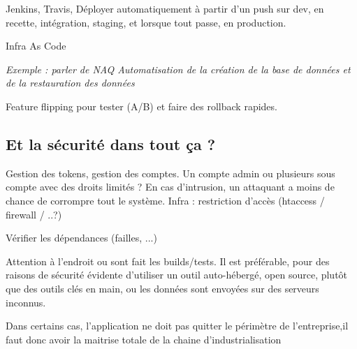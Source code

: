 Jenkins, Travis, Déployer automatiquement à partir d'un push sur dev, en recette, intégration, staging, et lorsque tout passe, en production.

Infra As Code %

\textit{Exemple : parler de NAQ Automatisation de la création de la base de données et de la restauration des données}

Feature flipping pour tester (A/B) et faire des rollback rapides.

\subsection{Et la sécurité dans tout ça ?}


Gestion des tokens, gestion des comptes.
Un compte admin ou plusieurs sous compte avec des droits limités ? En cas d'intrusion, un attaquant a moins de chance de corrompre tout le système.
Infra : restriction d'accès (htaccess / firewall / ..?)

Vérifier les dépendances (failles, ...)

Attention à l'endroit ou sont fait les builds/tests. Il est préférable, pour des raisons de sécurité évidente d'utiliser un outil auto-hébergé, open source, plutôt que des outils clés en main, ou les données sont envoyées sur des serveurs inconnus. 

Dans certains cas, l'application ne doit pas quitter le périmètre de l'entreprise,il faut donc avoir la maitrise totale de la chaine d'industrialisation
